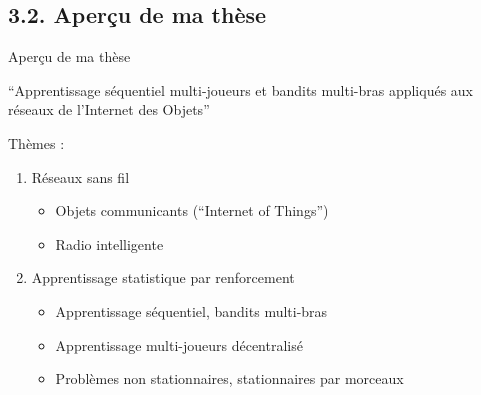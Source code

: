 \documentclass[11pt,english,ignorenonframetext,]{beamer}
\begin{document}





\subsection{\hfill{}3.2. Aperçu de ma thèse\hfill{}}


\begin{frame}{Aperçu de ma thèse}

\begin{center}
  ``Apprentissage séquentiel multi-joueurs et bandits multi-bras appliqués aux réseaux de l'Internet des Objets''
\end{center}

Thèmes :

\begin{enumerate}
  \item
  Réseaux sans fil
  \begin{itemize}
    \item
    Objets communicants (``Internet of Things'')
    \item
    Radio intelligente
  \end{itemize}
  \item
  Apprentissage statistique par renforcement
  \begin{itemize}
    \item
    Apprentissage séquentiel, bandits multi-bras
    \item
    Apprentissage multi-joueurs décentralisé
    \item
    \alert{Problèmes non stationnaires, stationnaires par morceaux}
  \end{itemize}
\end{enumerate}

\end{frame}
\end{document}
